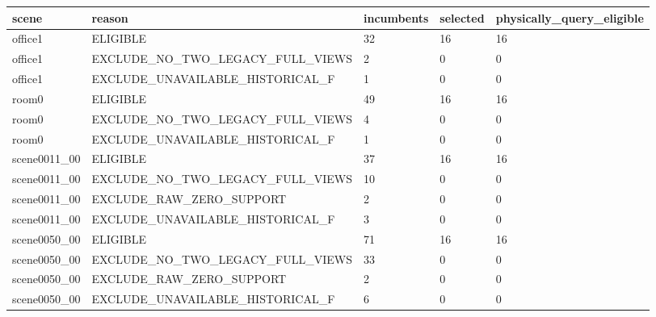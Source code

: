 \begin{tabular}{lllll}
\toprule
scene & reason & incumbents & selected & physically\_query\_eligible \\
\midrule
office1 & ELIGIBLE & 32 & 16 & 16 \\
office1 & EXCLUDE\_NO\_TWO\_LEGACY\_FULL\_VIEWS & 2 & 0 & 0 \\
office1 & EXCLUDE\_UNAVAILABLE\_HISTORICAL\_F & 1 & 0 & 0 \\
room0 & ELIGIBLE & 49 & 16 & 16 \\
room0 & EXCLUDE\_NO\_TWO\_LEGACY\_FULL\_VIEWS & 4 & 0 & 0 \\
room0 & EXCLUDE\_UNAVAILABLE\_HISTORICAL\_F & 1 & 0 & 0 \\
scene0011\_00 & ELIGIBLE & 37 & 16 & 16 \\
scene0011\_00 & EXCLUDE\_NO\_TWO\_LEGACY\_FULL\_VIEWS & 10 & 0 & 0 \\
scene0011\_00 & EXCLUDE\_RAW\_ZERO\_SUPPORT & 2 & 0 & 0 \\
scene0011\_00 & EXCLUDE\_UNAVAILABLE\_HISTORICAL\_F & 3 & 0 & 0 \\
scene0050\_00 & ELIGIBLE & 71 & 16 & 16 \\
scene0050\_00 & EXCLUDE\_NO\_TWO\_LEGACY\_FULL\_VIEWS & 33 & 0 & 0 \\
scene0050\_00 & EXCLUDE\_RAW\_ZERO\_SUPPORT & 2 & 0 & 0 \\
scene0050\_00 & EXCLUDE\_UNAVAILABLE\_HISTORICAL\_F & 6 & 0 & 0 \\
\bottomrule
\end{tabular}
